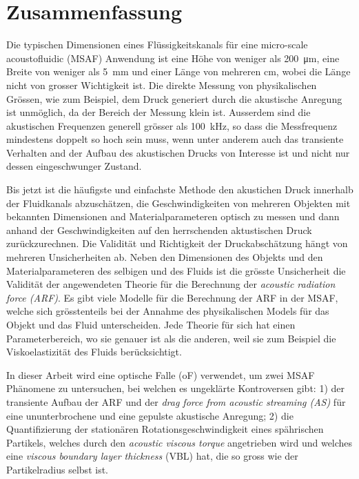 \chapter*{Zusammenfassung}

Die typischen Dimensionen eines Flüssigkeitskanals für eine micro-scale 
acoustofluidic (MSAF) Anwendung ist eine Höhe von weniger als \SI{200}{\um}, 
eine Breite von weniger als \SI{5}{\mm} und einer Länge von mehreren \si{\cm}, 
wobei die Länge nicht von grosser Wichtigkeit ist. Die direkte Messung von 
physikalischen Grössen, wie zum Beispiel, dem Druck generiert durch die 
akustische Anregung ist unmöglich, da der Bereich der Messung klein ist. 
Ausserdem sind die akustischen Frequenzen generell grösser als 
\SI{100}{\kilo\hertz}, so dass die Messfrequenz mindestens doppelt so hoch sein 
muss, wenn unter anderem auch das transiente Verhalten and der Aufbau des 
akustischen Drucks von Interesse ist und nicht nur dessen eingeschwunger 
Zustand.

Bis jetzt ist die häufigste und einfachste Methode den akustichen Druck 
innerhalb der Fluidkanals abzuschätzen, die Geschwindigkeiten von mehreren 
Objekten mit bekannten Dimensionen and Materialparameteren optisch zu messen 
und dann anhand der Geschwindigkeiten auf den herrschenden aktustischen Druck 
zurückzurechnen. Die Validität und Richtigkeit der Druckabschätzung hängt von 
mehreren Unsicherheiten ab. Neben den Dimensionen des Objekts und den 
Materialparameteren des selbigen und des Fluids ist die grösste Unsicherheit 
die Validität der angewendeten Theorie für die Berechnung der \emph{acoustic 
radiation force (ARF)}. Es gibt viele Modelle für die Berechnung der ARF in der 
MSAF, welche sich grösstenteils bei der Annahme des physikalischen Models für 
das Objekt und das Fluid unterscheiden. Jede Theorie für sich hat einen 
Parameterbereich, wo sie genauer ist als die anderen, weil sie zum Beispiel die 
Viskoelastizität des Fluids berücksichtigt.

In dieser Arbeit wird eine optische Falle (oF) verwendet, um zwei MSAF 
Phänomene zu untersuchen, bei welchen es ungeklärte Kontroversen gibt: 1) der 
transiente Aufbau der ARF und der \emph{drag force from acoustic streaming 
(AS)} für eine ununterbrochene und eine gepulste akustische Anregung; 2) die 
Quantifizierung der stationären Rotationsgeschwindigkeit eines spährischen 
Partikels, welches durch den \emph{acoustic viscous torque} angetrieben wird 
und welches eine \emph{viscous boundary layer thickness} (VBL) hat, die so 
gross wie der Partikelradius selbst ist.

